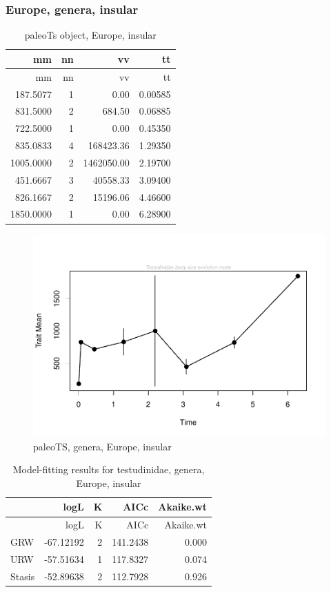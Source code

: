 \FloatBarrier



\subsubsection*{Europe, genera,
	insular}\label{europe-genera-insular}

\begin{longtable}[]{@{}rrrr@{}}
	\caption{paleoTs object, Europe, insular}
	\label{tab:pTSEuI}\tabularnewline
	\toprule
	mm & nn & vv & tt\tabularnewline
	\midrule
	\endfirsthead
	\toprule
	mm & nn & vv & tt\tabularnewline
	\midrule
	\endhead
	187.5077 & 1 & 0.00 & 0.00585\tabularnewline
	831.5000 & 2 & 684.50 & 0.06885\tabularnewline
	722.5000 & 1 & 0.00 & 0.45350\tabularnewline
	835.0833 & 4 & 168423.36 & 1.29350\tabularnewline
	1005.0000 & 2 & 1462050.00 & 2.19700\tabularnewline
	451.6667 & 3 & 40558.33 & 3.09400\tabularnewline
	826.1667 & 2 & 15196.06 & 4.46600\tabularnewline
	1850.0000 & 1 & 0.00 & 6.28900\tabularnewline
	\bottomrule
\end{longtable}

\begin{figure}[H]
	\centering
	\includegraphics{MA_JJ_files/figure-latex/pTSEuI-1.pdf}
	\caption{paleoTS, genera, Europe, insular}
	\label{fig:pTSEuI}
\end{figure}

\begin{longtable}[]{@{}lrrrr@{}}
	\caption{Model-fitting results for testudinidae, genera, Europe,
		insular}
	\label{tab:pTSEuIEM}\tabularnewline
	\toprule
	& logL & K & AICc & Akaike.wt\tabularnewline
	\midrule
	\endfirsthead
	\toprule
	& logL & K & AICc & Akaike.wt\tabularnewline
	\midrule
	\endhead
	GRW & -67.12192 & 2 & 141.2438 & 0.000\tabularnewline
	URW & -57.51634 & 1 & 117.8327 & 0.074\tabularnewline
	Stasis & -52.89638 & 2 & 112.7928 & 0.926\tabularnewline
	\bottomrule
\end{longtable}

